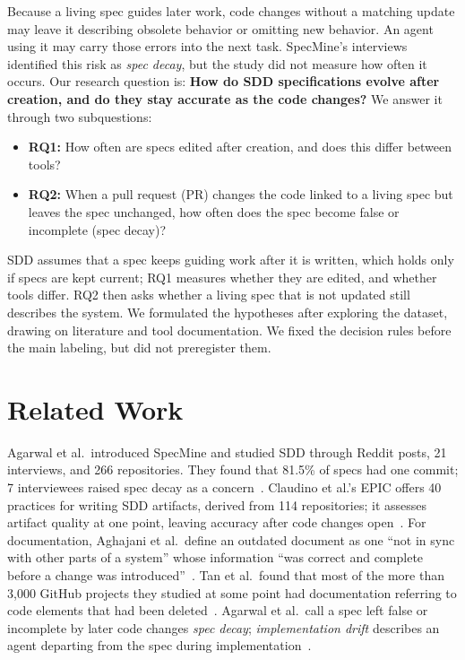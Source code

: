 \documentclass[10pt,conference]{IEEEtran}
\begin{document}
Because a living spec guides later work, code changes without a matching update may leave it describing obsolete behavior or omitting new behavior. An agent using it may carry those errors into the next task. SpecMine's interviews identified this risk as \emph{spec decay}, but the study did not measure how often it occurs. Our research question is: \textbf{How do SDD specifications evolve after creation, and do they stay accurate as the code changes?} We answer it through two subquestions:

\begin{itemize}
\item \textbf{RQ1:} How often are specs edited after creation, and does this differ between tools?
\item \textbf{RQ2:} When a pull request (PR) changes the code linked to a living spec but leaves the spec unchanged, how often does the spec become false or incomplete (spec decay)?
\end{itemize}

SDD assumes that a spec keeps guiding work after it is written, which holds only if specs are kept current; RQ1 measures whether they are edited, and whether tools differ. RQ2 then asks whether a living spec that is not updated still describes the system. We formulated the hypotheses after exploring the dataset, drawing on literature and tool documentation. We fixed the decision rules before the main labeling, but did not preregister them.

\section{Related Work}
Agarwal et al.\ introduced SpecMine and studied SDD through Reddit posts, 21 interviews, and 266 repositories. They found that 81.5\% of specs had one commit; 7 interviewees raised spec decay as a concern~\cite{agarwal2026sdd}. Claudino et al.'s EPIC offers 40 practices for writing SDD artifacts, derived from 114 repositories; it assesses artifact quality at one point, leaving accuracy after code changes open~\cite{claudino2026epic}. For documentation, Aghajani et al.\ define an outdated document as one ``not in sync with other parts of a system'' whose information ``was correct and complete before a change was introduced''~\cite{aghajani2019issues}. Tan et al.\ found that most of the more than 3,000 GitHub projects they studied at some point had documentation referring to code elements that had been deleted~\cite{tan2024outdated}. Agarwal et al.\ call a spec left false or incomplete by later code changes \emph{spec decay}; \emph{implementation drift} describes an agent departing from the spec during implementation~\cite{agarwal2026sdd}.
\end{document}
